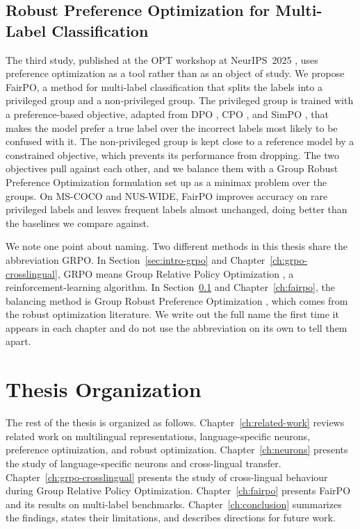\subsection{Robust Preference Optimization for Multi-Label Classification}
\label{sec:intro-fairpo}

The third study, published at the OPT workshop at NeurIPS~2025
\citep{mondal2025fairpo}, uses preference optimization as a tool rather than as an
object of study. We propose FairPO, a method for multi-label classification that
splits the labels into a privileged group and a non-privileged group. The
privileged group is trained with a preference-based objective, adapted from DPO
\citep{rafailov2023direct}, CPO \citep{xu2024contrastive}, and SimPO
\citep{meng2024simpo}, that makes the model prefer a true label over the incorrect
labels most likely to be confused with it. The non-privileged group is kept close
to a reference model by a constrained objective, which prevents its performance
from dropping. The two objectives pull against each other, and we balance them
with a Group Robust Preference Optimization formulation \citep{ramesh2024group}
set up as a minimax problem over the groups. On MS-COCO and NUS-WIDE, FairPO
improves accuracy on rare privileged labels and leaves frequent labels almost
unchanged, doing better than the baselines we compare against.

We note one point about naming. Two different methods in this thesis share the
abbreviation GRPO. In Section~\ref{sec:intro-grpo} and
Chapter~\ref{ch:grpo-crosslingual}, GRPO means Group Relative Policy Optimization
\citep{shao2024deepseekmath}, a reinforcement-learning algorithm. In
Section~\ref{sec:intro-fairpo} and Chapter~\ref{ch:fairpo}, the balancing method
is Group Robust Preference Optimization \citep{ramesh2024group}, which comes from
the robust optimization literature. We write out the full name the first time it
appears in each chapter and do not use the abbreviation on its own to tell them
apart.

\section{Thesis Organization}
\label{sec:intro-organization}

The rest of the thesis is organized as follows.
Chapter~\ref{ch:related-work} reviews related work on multilingual
representations, language-specific neurons, preference optimization, and robust
optimization. Chapter~\ref{ch:neurons} presents the study of language-specific
neurons and cross-lingual transfer. Chapter~\ref{ch:grpo-crosslingual} presents
the study of cross-lingual behaviour during Group Relative Policy Optimization.
Chapter~\ref{ch:fairpo} presents FairPO and its results on multi-label
benchmarks. Chapter~\ref{ch:conclusion} summarizes the findings, states their
limitations, and describes directions for future work.